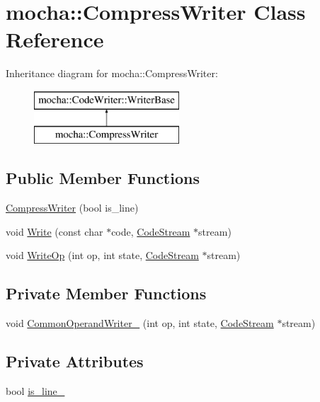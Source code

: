 \hypertarget{classmocha_1_1_compress_writer}{
\section{mocha::CompressWriter Class Reference}
\label{classmocha_1_1_compress_writer}
}
Inheritance diagram for mocha::CompressWriter:\begin{figure}[H]
\begin{center}
\leavevmode
\includegraphics[height=2.000000cm]{classmocha_1_1_compress_writer}
\end{center}
\end{figure}
\subsection*{Public Member Functions}
\begin{DoxyCompactItemize}
\item 
\hyperlink{classmocha_1_1_compress_writer_aed9f3a3511a31415f16614a3c8d7e809}{CompressWriter} (bool is\_\-line)
\item 
void \hyperlink{classmocha_1_1_compress_writer_a1cc68dc2e54c584e33336c18f5a14aee}{Write} (const char $\ast$code, \hyperlink{classmocha_1_1_code_stream}{CodeStream} $\ast$stream)
\item 
void \hyperlink{classmocha_1_1_compress_writer_a89aadb6948d3ffdb643d45ed8e349786}{WriteOp} (int op, int state, \hyperlink{classmocha_1_1_code_stream}{CodeStream} $\ast$stream)
\end{DoxyCompactItemize}
\subsection*{Private Member Functions}
\begin{DoxyCompactItemize}
\item 
void \hyperlink{classmocha_1_1_compress_writer_a3cdbde44e77775591914f2a2734ff88f}{CommonOperandWriter\_\-} (int op, int state, \hyperlink{classmocha_1_1_code_stream}{CodeStream} $\ast$stream)
\end{DoxyCompactItemize}
\subsection*{Private Attributes}
\begin{DoxyCompactItemize}
\item 
bool \hyperlink{classmocha_1_1_compress_writer_a934a10b612f235440cfef0a4ccbcaa5a}{is\_\-line\_\-}
\end{DoxyCompactItemize}


